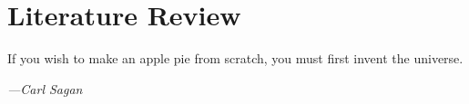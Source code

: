 \chapter{Literature Review} \label{ch:literature}
\epigraph{If you wish to make an apple pie from scratch, you must first invent the universe.}%
    {\emph{---Carl Sagan}}
\vspace{0.5cm}
\lipsum[2-4]
